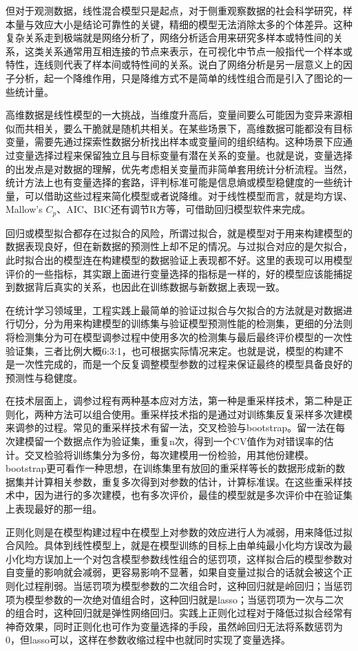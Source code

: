 \documentclass[]{tufte-book}
\begin{document}
但对于观测数据，线性混合模型只是起点，对于侧重观察数据的社会科学研究，样本量与效应大小是结论可靠性的关键，精细的模型无法消除太多的个体差异。这种复杂关系走到极端就是网络分析了，网络分析适合用来研究多样本或特性间的关系，这类关系通常用互相连接的节点来表示，在可视化中节点一般指代一个样本或特性，连线则代表了样本间或特性间的关系。说白了网络分析是另一层意义上的因子分析，起一个降维作用，只是降维方式不是简单的线性组合而是引入了图论的一些统计量。

高维数据是线性模型的一大挑战，当维度升高后，变量间要么可能因为变异来源相似而共相关，要么干脆就是随机共相关。在某些场景下，高维数据可能都没有目标变量，需要先通过探索性数据分析找出样本或变量间的组织结构。这种场景下应通过变量选择过程来保留独立且与目标变量有潜在关系的变量。也就是说，变量选择的出发点是对数据的理解，优先考虑相关变量而非简单套用统计分析流程。当然，统计方法上也有变量选择的套路，评判标准可能是信息熵或模型稳健度的一些统计量，可以借助这些过程来简化模型或者说降维。对于线性模型而言，就是均方误、Mallow's \(C_p\)、AIC、BIC还有调节R方等，可借助回归模型软件来完成。

回归或模型拟合都存在过拟合的风险，所谓过拟合，就是模型对于用来构建模型的数据表现良好，但在新数据的预测性上却不足的情况。与过拟合对应的是欠拟合，此时拟合出的模型连在构建模型的数据验证上表现都不好。这里的表现可以用模型评价的一些指标，其实跟上面进行变量选择的指标是一样的，好的模型应该能捕捉到数据背后真实的关系，也因此在训练数据与新数据上表现一致。

在统计学习领域里，工程实践上最简单的验证过拟合与欠拟合的方法就是对数据进行切分，分为用来构建模型的训练集与验证模型预测性能的检测集，更细的分法则将检测集分为可在模型调参过程中使用多次的检测集与最后最终评价模型的一次性验证集，三者比例大概6:3:1，也可根据实际情况来定。也就是说，模型的构建不是一次性完成的，而是一个反复调整模型参数的过程来保证最终的模型具备良好的预测性与稳健度。

在技术层面上，调参过程有两种基本应对方法，第一种是重采样技术，第二种是正则化，两种方法可以组合使用。重采样技术指的是通过对训练集反复采样多次建模来调参的过程。常见的重采样技术有留一法，交叉检验与bootstrap。留一法在每次建模留一个数据点作为验证集，重复n次，得到一个CV值作为对错误率的估计。交叉检验将训练集分为多份，每次建模用一份检验，用其他份建模。bootstrap更可看作一种思想，在训练集里有放回的重采样等长的数据形成新的数据集并计算相关参数，重复多次得到对参数的估计，计算标准误。在这些重采样技术中，因为进行的多次建模，也有多次评价，最佳的模型就是多次评价中在验证集上表现最好的那一组。

正则化则是在模型构建过程中在模型上对参数的效应进行人为减弱，用来降低过拟合风险。具体到线性模型上，就是在模型训练的目标上由单纯最小化均方误改为最小化均方误加上一个对包含模型参数线性组合的惩罚项，这样拟合后的模型参数对自变量的影响就会减弱，更容易影响不显著，如果自变量过拟合的话就会被这个正则化过程削弱。当惩罚项为模型参数的二次组合时，这种回归就是岭回归；当惩罚项为模型参数的一次绝对值组合时，这种回归就是lasso；当惩罚项为一次与二次的组合时，这种回归就是弹性网络回归。实践上正则化过程对于降低过拟合经常有神奇效果，同时正则化也可作为变量选择的手段，虽然岭回归无法将系数惩罚为0，但lasso可以，这样在参数收缩过程中也就同时实现了变量选择。
\end{document}
